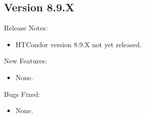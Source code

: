 \subsection*{\label{sec:New-8-9-X}Version 8.9.X}

\noindent Release Notes:

\begin{itemize}

\item HTCondor version 8.9.X not yet released.

\end{itemize}


\noindent New Features:

\begin{itemize}

\item None.

\end{itemize}

\noindent Bugs Fixed:

\begin{itemize}

\item None.

\end{itemize}

